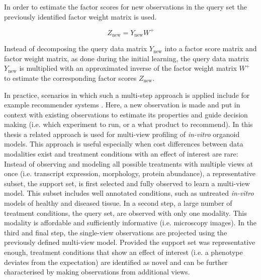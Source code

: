 \begin{flushleft}
In order to estimate the factor scores for new observations in the query set the previously identified factor weight matrix is used. 

\begin{equation}
    Z_{\text{new}} = Y_{\text{new}} W^+
\end{equation}

Instead of decomposing the query data matrix \(Y_{\text{new}}\) into a factor score matrix and factor weight matrix, as done during the initial learning, the query data matrix  \(Y_{\text{new}}\) is multiplied with an approximated inverse of the factor weight matrix \( W^+ \) to estimate the corresponding factor scores \( Z_{\text{new}} \).
\par

In practice, scenarios in which such a multi-step approach is applied include for example recommender systems \citep{korenMatrixFactorizationTechniques2009}. Here, a new observation is made and put in context with existing observations to estimate its properties and guide decision making (i.e. which experiment to run, or a what product to recommend). In this thesis a related approach is used for multi-view profiling of \textit{in-vitro} organoid models. This approach is useful especially when cost differences between data modalities exist and treatment conditions with an effect of interest are rare: Instead of observing and modeling all possible treatments with multiple views at once (i.e. transcript expression, morphology, protein abundance), a representative subset, the support set, is first selected and fully observed to learn a multi-view model. This subset includes well annotated conditions, such as untreated \textit{in-vitro} models of healthy and diseased tissue. In a second step, a large number of treatment conditions, the query set, are observed with only one modality. This modality is affordable and sufficiently informative (i.e. microscopy images). In the third and final step, the single-view observations are projected using the previously defined multi-view model. Provided the support set was representative enough, treatment conditions that show an effect of interest (i.e. a phenotype deviates from the expectation) are identified as novel and can be further characterised by making observations from additional views.


\end{flushleft}
